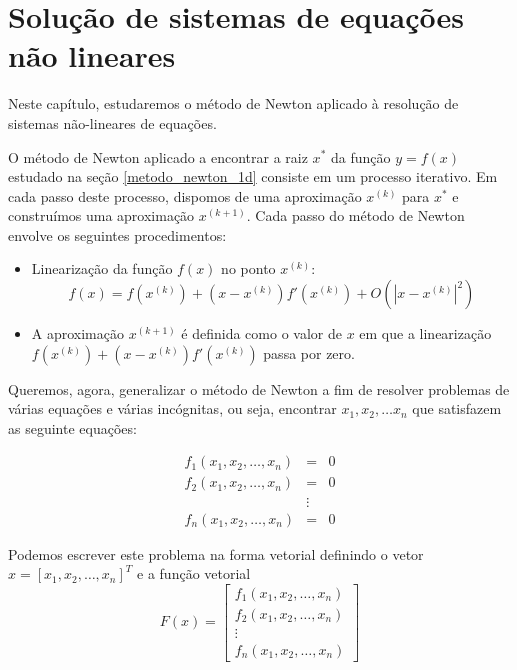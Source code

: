 
%

\chapter{Solução de sistemas de equações não lineares}
Neste capítulo, estudaremos o método de Newton aplicado à resolução de sistemas não-lineares de equações.

O método de Newton aplicado a encontrar a raiz $x^*$ da função $y=f(x)$ estudado na seção \ref{metodo_newton_1d} consiste em um processo iterativo. Em cada passo deste processo, dispomos de uma aproximação $x^{(k)}$ para $x^*$ e construímos uma aproximação $x^{(k+1)}$.  Cada passo do método de Newton envolve os seguintes procedimentos:
\begin{itemize}
\item Linearização da função $f(x)$ no ponto $x^{(k)}$: 
  \begin{equation*}
    f(x)= f(x^{(k)})+ (x-x^{(k)}) f'(x^{(k)}) + O\left(|x-x^{(k)}|^2\right)    
  \end{equation*}
\item A aproximação $x^{(k+1)}$ é definida como o valor de $x$ em que a linearização $f(x^{(k)})+ (x-x^{(k)}) f'(x^{(k)})$ passa por zero.
\end{itemize}


Queremos, agora, generalizar o método de Newton a fim de resolver problemas de várias equações e várias incógnitas, ou seja, encontrar $x_1,x_2,\ldots x_n$ que satisfazem as seguinte equações:

\begin{eqnarray*}
f_1(x_1,x_2,\ldots,x_n)&=&0\\
f_2(x_1,x_2,\ldots,x_n)&=&0\\
&\vdots&\\
f_n(x_1,x_2,\ldots,x_n)&=&0
\end{eqnarray*}

Podemos escrever este problema na forma vetorial definindo o vetor $x=[x_1,x_2,\ldots,x_n]^T$ e a função vetorial
$$F(x)=\left[
\begin{array}{c}
f_1(x_1,x_2,\ldots,x_n)\\
f_2(x_1,x_2,\ldots,x_n)\\
\vdots\\
f_n(x_1,x_2,\ldots,x_n)
\end{array}
\right]$$

